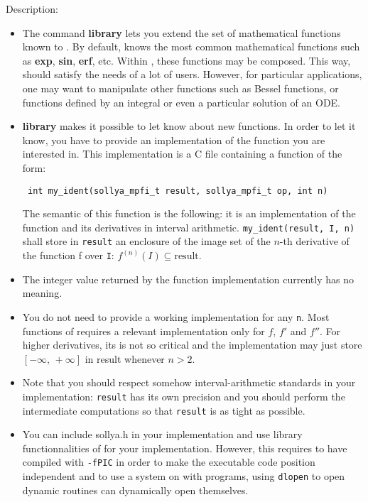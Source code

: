 \noindent Description: \begin{itemize}

\item The command \textbf{library} lets you extend the set of mathematical
   functions known to \sollya.
   By default, \sollya knows the most common mathematical functions such
   as \textbf{exp}, \textbf{sin}, \textbf{erf}, etc. Within \sollya, these functions may be
   composed. This way, \sollya should satisfy the needs of a lot of
   users. However, for particular applications, one may want to
   manipulate other functions such as Bessel functions, or functions
   defined by an integral or even a particular solution of an ODE.

\item \textbf{library} makes it possible to let \sollya know about new functions. In
   order to let it know, you have to provide an implementation of the
   function you are interested in. This implementation is a C file containing
   a function of the form:
   \begin{verbatim} int my_ident(sollya_mpfi_t result, sollya_mpfi_t op, int n)\end{verbatim}
   The semantic of this function is the following: it is an implementation of
   the function and its derivatives in interval arithmetic.
   \verb|my_ident(result, I, n)| shall store in \verb|result| an enclosure 
   of the image set of the $n$-th derivative
   of the function f over \verb|I|: $f^{(n)}(I) \subseteq \mathrm{result}$.

\item The integer value returned by the function implementation currently has no meaning.

\item You do not need to provide a working implementation for any \verb|n|. Most functions
   of \sollya requires a relevant implementation only for $f$, $f'$ and $f''$. For higher 
   derivatives, its is not so critical and the implementation may just store 
   $[-\infty,\,+\infty]$ in result whenever $n>2$.

\item Note that you should respect somehow interval-arithmetic standards in your implementation:
   \verb|result| has its own precision and you should perform the 
   intermediate computations so that \verb|result| is as tight as possible.

\item You can include sollya.h in your implementation and use library 
   functionnalities of \sollya for your implementation. However, this requires to have compiled
   \sollya with \texttt{-fPIC} in order to make the \sollya executable code position 
   independent and to use a system on with programs, using \texttt{dlopen} to open
   dynamic routines can dynamically open themselves.


\end{itemize}
